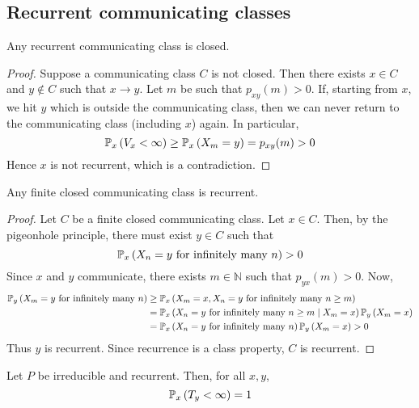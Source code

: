 \subsection{Recurrent communicating classes}
\begin{theorem}
	Any recurrent communicating class is closed.
\end{theorem}
\begin{proof}
	Suppose a communicating class \( C \) is not closed.
	Then there exists \( x \in C \) and \( y \not\in C \) such that \( x \to y \).
	Let \( m \) be such that \( p_{xy}(m) > 0 \).
	If, starting from \( x \), we hit \( y \) which is outside the communicating class, then we can never return to the communicating class (including \( x \)) again.
	In particular,
	\[
		\mathbb{P}_{x}\left({V_x < \infty}\right) \geq \mathbb{P}_{x}\left({X_m = y}\right) = p_{xy}(m) > 0
	\]
	Hence \( x \) is not recurrent, which is a contradiction.
\end{proof}
\begin{theorem}
	Any finite closed communicating class is recurrent.
\end{theorem}
\begin{proof}
	Let \( C \) be a finite closed communicating class.
	Let \( x \in C \).
	Then, by the pigeonhole principle, there must exist \( y \in C \) such that
	\[
		\mathbb{P}_{x}\left({X_n = y \text{ for infinitely many } n}\right) > 0
	\]
	Since \( x \) and \( y \) communicate, there exists \( m \in \mathbb N \) such that \( p_{yx}(m) > 0 \).
	Now,
	\begin{align*}
		\mathbb{P}_{y}\left({X_m = y \text{ for infinitely many } n}\right) & \geq \mathbb{P}_{x}\left({X_m = x, X_n = y \text{ for infinitely many } n \geq m}\right)                   \\
		                                                 & =\mathbb{P}_{x}\left({X_n = y \text{ for infinitely many } n \geq m \mid X_m = x}\right) \mathbb{P}_{y}\left({X_m = x}\right) \\
		                                                 & =\mathbb{P}_{x}\left({X_n = y \text{ for infinitely many } n}\right) \mathbb{P}_{y}\left({X_m = x}\right) > 0
	\end{align*}
	Thus \( y \) is recurrent.
	Since recurrence is a class property, \( C \) is recurrent.
\end{proof}
\begin{theorem}
	Let \( P \) be irreducible and recurrent.
	Then, for all \( x, y \),
	\[
		\mathbb{P}_{x}\left({T_y < \infty}\right) = 1
	\]
\end{theorem}

